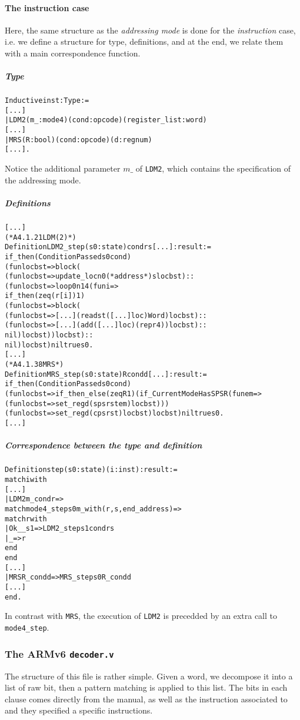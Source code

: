 \documentclass[a4paper, 11pt]{article}
\newenvironment{coq}
  {%
   \begin{alltt}} %% 8.3pl1 (January 2011)
  {\end{alltt} %
  }
\begin{document}
\paragraph{The instruction case}
Here, the same structure as the \emph{addressing mode} is done for the \emph{instruction} case, i.e. we define a structure for type, definitions, and at the end, we relate them with a main correspondence function.
  \subparagraph{Type}
\begin{coq}
Inductive inst : Type := 
[...]
  | LDM2 (m_ : mode4) (cond : opcode) (register_list : word) 
[...]
  | MRS (R : bool) (cond : opcode) (d : regnum) 
[...].
\end{coq}
Notice the additional parameter $m\_$ of {\tt LDM2}, which contains the specification of the addressing mode.
  \subparagraph{Definitions}
\begin{coq}
[...]
(* A4.1.21 LDM (2) *)
Definition LDM2_step (s0 : state) cond r s [...] : result :=
  if_then (ConditionPassed s0 cond)
    (fun loc b st => block (
      (fun loc b st => update_loc n0 (*address*) s loc b st) ::
      (fun loc b st => loop 0 n14 (fun i => 
        if_then (zeq (r[i]) 1)
          (fun loc b st => block (
            (fun loc b st => [...] (read st ([...] loc) Word) loc b st) ::
            (fun loc b st => [...] (add ([...] loc) (repr 4)) loc b st) ::
            nil) loc b st)) loc b st) ::
      nil) loc b st) nil true s0.
[...]
(* A4.1.38 MRS *)
Definition MRS_step (s0 : state) R cond d [...] : result :=
  if_then (ConditionPassed s0 cond)
    (fun loc b st => if_then_else (zeq R 1) (if_CurrentModeHasSPSR (fun em =>
      (fun loc b st => set_reg d (spsr st em) loc b st)))
      (fun loc b st => set_reg d (cpsr st) loc b st) loc b st) nil true s0.
[...]
\end{coq}
  \subparagraph{Correspondence between the type and definition}
\begin{coq}
Definition step (s0 : state) (i : inst) : result :=
  match i with
[...]
    | LDM2 m_ cond r =>
      match mode4_step s0 m_ with (r, s, end_address) =>
        match r with
          | Ok _ _ s1 => LDM2_step s1 cond r s
          | _ => r
        end
      end
[...]
    | MRS R_ cond d => MRS_step s0 R_ cond d
[...]
  end.
\end{coq}
In contrast with {\tt MRS}, the execution of {\tt LDM2} is precedded by an extra call to {\tt mode4\_step}.
\subsubsection{The ARMv6 {\tt decoder.v}}
The structure of this file is rather simple. Given a word, we decompose it into a list of raw bit, then a pattern matching is applied to this list. The bits in each clause comes directly from the manual, as well as the instruction associated to and they specified a specific instructions.
\end{document}
